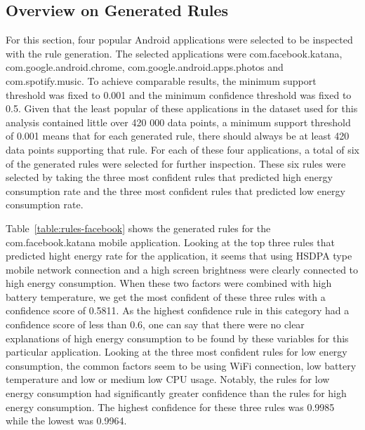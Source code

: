 
\subsection{Overview on Generated Rules}

For this section, four popular Android applications were selected to be inspected with the rule generation. The selected applications were com.facebook.katana, com.google.android.chrome, com.google.android.apps.photos and com.spotify.music. To achieve comparable results, the minimum support threshold was fixed to 0.001 and the minimum confidence threshold was fixed to 0.5. Given that the least popular of these applications in the dataset used for this analysis contained little over 420 000 data points, a minimum support threshold of 0.001 means that for each generated rule, there should always be at least 420 data points supporting that rule. For each of these four applications, a total of six of the generated rules were selected for further inspection. These six rules were selected by taking the three most confident rules that predicted high energy consumption rate and the three most confident rules that predicted low energy consumption rate.  

Table~\ref{table:rules-facebook} shows the generated rules for the com.facebook.katana mobile application. Looking at the top three rules that predicted hight energy rate for the application, it seems that using HSDPA type mobile network connection and a high screen brightness were clearly connected to high energy consumption. When these two factors were combined with high battery temperature, we get the most confident of these three rules with a confidence score of 0.5811. As the highest confidence rule in this category had a confidence score of less than 0.6, one can say that there were no clear explanations of high energy consumption to be found by these variables for this particular application. Looking at the three most confident rules for low energy consumption, the common factors seem to be using WiFi connection, low battery temperature and low or medium low CPU usage. Notably, the rules for low energy consumption had significantly greater confidence than the rules for high energy consumption. The highest confidence for these three rules was 0.9985 while the lowest was 0.9964. 

